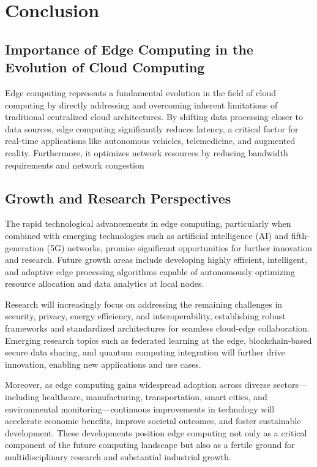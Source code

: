 \documentclass[runningheads]{llncs}
\begin{document}
\section{Conclusion}
\subsection{Importance of Edge Computing in the Evolution of Cloud Computing}

Edge computing represents a fundamental evolution in the field of cloud computing by directly addressing and overcoming inherent limitations of traditional centralized cloud architectures. By shifting data processing closer to data sources, edge computing significantly reduces latency, a critical factor for real-time applications like autonomous vehicles, telemedicine, and augmented reality. Furthermore, it optimizes network resources by reducing bandwidth requirements and network congestion


\subsection{Growth and Research Perspectives}

The rapid technological advancements in edge computing, particularly when combined with emerging technologies such as artificial intelligence (AI) and fifth-generation (5G) networks, promise significant opportunities for further innovation and research. Future growth areas include developing highly efficient, intelligent, and adaptive edge processing algorithms capable of autonomously optimizing resource allocation and data analytics at local nodes.

Research will increasingly focus on addressing the remaining challenges in security, privacy, energy efficiency, and interoperability, establishing robust frameworks and standardized architectures for seamless cloud-edge collaboration. Emerging research topics such as federated learning at the edge, blockchain-based secure data sharing, and quantum computing integration will further drive innovation, enabling new applications and use cases.

Moreover, as edge computing gains widespread adoption across diverse sectors—
including healthcare, manufacturing, transportation, smart cities, and environmental monitoring—continuous improvements in technology will accelerate economic benefits, improve societal outcomes, and foster sustainable development. These developments position edge computing not only as a critical component of the future computing landscape but also as a fertile ground for multidisciplinary research and substantial industrial growth.
\end{document}
